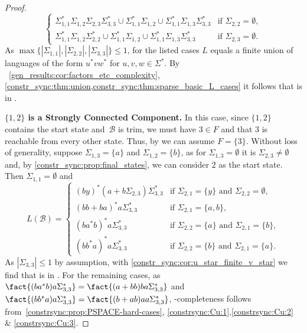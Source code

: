 \begin{proof}
\[\begin{cases}
	\Sigma_{1,1}^* \Sigma_{1,2} \Sigma_{2,3} \Sigma_{3,3}^* \cup \Sigma_{1,1}^* \Sigma_{1,2}\cup \Sigma_{1,1}^* \Sigma_{1,3} \Sigma_{3,3}^* & \text{if } \Sigma_{2,2} = \emptyset, \\
	\Sigma_{1,1}^* \Sigma_{1,2} \Sigma_{2,2}^* \cup \Sigma_{1,1}^* \Sigma_{1,2}\cup \Sigma_{1,1}^* \Sigma_{1,3} \Sigma_{3,3}^* &
	\text{if } \Sigma_{2,3} = \emptyset.
\end{cases}
\]
As $\max\{ |\Sigma_{1,1}|, |\Sigma_{2,2}|, |\Sigma_{3,3}| \} \le 1$, for the listed cases
$L$ equals a finite union of languages 
of the form $u^* v w^*$ for $u,v,w \in \Sigma^*$.
By \COR~\ref{gen_results:cor:factors_etc_complexity}, \cref{constr_sync:thm:union,constr_sync:thm:sparse_basic_L_cases}
it follows that  is in \LOGSPACE.   

\medskip
\noindent\textbf{\texorpdfstring{$\{1,2\}$}{{1,2}} is a Strongly Connected Component.} 
In this case, since $\{1,2\}$ contains the start state and~$\mathcal B$ is trim,
we must have $3 \in F$ and that $3$ is reachable from every other state.
Thus, by 
we can assume $F = \{3\}$. 
Without loss of generality, suppose $\Sigma_{1,3} = \{a\}$
and $\Sigma_{1,2} = \{b\}$, as for $\Sigma_{1,3} = \emptyset$
it is $\Sigma_{2,3} \ne \emptyset$ 
and, by \cref{constr_sync:prop:final_states}, we can consider $2$ as
the start state. Then $\Sigma_{1,1} = \emptyset$
and
\[
L(\mathcal B) = 
\begin{cases}
	(by)^*(a + b\Sigma_{2,3})\Sigma_{3,3}^*  & \text{if } \Sigma_{2,1} = \{y\} \text{ and } \Sigma_{2,2} = \emptyset, \\
	(bb+ba)^*a\Sigma_{3,3}^*  & \text{if } \Sigma_{2,1} = \{a,b\}, \\
	(ba^*b)^*a\Sigma_{3,3}^*  & \text{if } \Sigma_{2,2} = \{a\} \text{ and } \Sigma_{2,1} = \{b\}, \\
	(bb^*a)^*a\Sigma_{3,3}^*    & \text{if } \Sigma_{2,2} = \{b\} \text{ and } \Sigma_{2,1} = \{a\}. 
\end{cases}
\]
As $|\Sigma_{3,3}| \le 1$ by assumption,
with \cref{constr_sync:cor:u_star_finite_v_star} we find that  is in \LOGSPACE.
For the remaining cases, as $\fact{(ba^*b)a\Sigma_{3,3}^*} = \fact{(a+bb)ba\Sigma_{3,3}^*}$
and $\fact{(bb^*a)a\Sigma_{3,3}^*} = \fact{(b+ab)aa\Sigma_{3,3}^*}$,
\PSPACE-completeness follows from~\cref{constrsync:prop:PSPACE-hard-cases}, \ref{constrsync:Cu:1},\ref{constrsync:Cu:2} \& \ref{constrsync:Cu:3}.


\end{proof}
